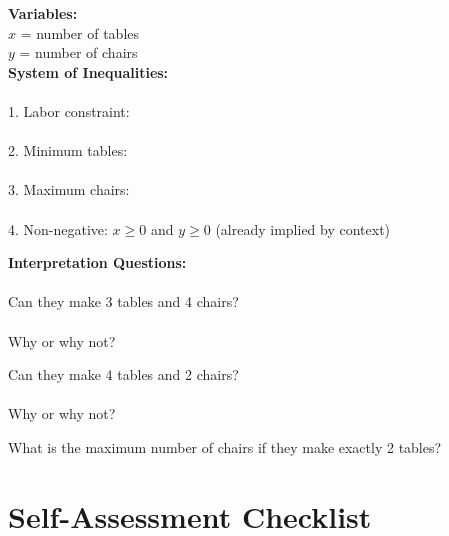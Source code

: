 \documentclass[12pt]{article}
\begin{document}
	        \textbf{Variables:}\\
	        $x$ = number of tables\\
	        $y$ = number of chairs\\
	
	        \textbf{System of Inequalities:}\\\\
	        1. Labor constraint: \underline{\hspace{4in}}\\\\
	        2. Minimum tables: \underline{\hspace{4in}}\\\\
	        3. Maximum chairs: \underline{\hspace{4in}}\\\\
	        4. Non-negative: $x \geq 0$ and $y \geq 0$ (already implied by context)\\
	
	        \newpage
	
	        \textbf{Interpretation Questions:}\\\\
		    Can they make 3 tables and 4 chairs?\\\\
			Why or why not?
	
		    \vspace{4cm}
		
		    Can they make 4 tables and 2 chairs?\\\\
			Why or why not?
			
		    \vspace{4cm}
	
		    What is the maximum number of chairs if they make exactly 2 tables?
	
	        \newpage
	
	\section*{Self-Assessment Checklist}
	
\end{document}

